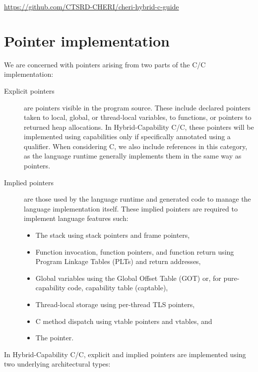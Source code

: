 \documentclass[12pt,twoside,openright,a4paper]{article}
\newcommand{\ccode}[1]{{\small\ttfamily{#1}}}
\newcommand{\uucap}{{\ccode{\_\_capability}}\xspace}
\newcommand*{\cpp}{\texorpdfstring{C\textsmaller[2]{\protect\nolinebreak[4]\hspace{-.05em}\raisebox{.45ex}{\textbf{++}}}}{C++}}
\newcommand*{\COrCpp}{C/\cpp{}}
\newcommand*{\hybridCOrCpp}{Hybrid-Capability \COrCpp{}}
\begin{document}
\smallskip

\url{https://github.com/CTSRD-CHERI/cheri-hybrid-c-guide}

\section{Pointer implementation}

We are concerned with pointers arising from two parts of the \COrCpp{} implementation:

\begin{description}
\item[Explicit pointers] are pointers visible in the program source.
  These include declared pointers taken to local, global, or thread-local
  variables, to functions, or pointers to returned heap allocations.
  In \hybridCOrCpp{}, these pointers will be implemented using capabilities
  only if specifically annotated using a \uucap qualifier.
  When considering \cpp, we also include references in this category, as
  the language runtime generally implements them in the same way as pointers.

\item[Implied pointers] are those used by the language runtime and generated
  code to manage the language implementation itself.
  These implied pointers are required to implement language features such:

  \begin{itemize}
  \item The stack using stack pointers and frame pointers,
  \item Function invocation, function pointers, and function return using
    Program Linkage Tables (PLTs) and return addresses,
  \item Global variables using the Global Offset Table (GOT) or, for
    pure-capability code, capability table (captable),
  \item Thread-local storage using per-thread TLS pointers,
  \item \cpp{} method dispatch using vtable pointers and vtables, and
  \item The \ccode{this} pointer.
  \end{itemize}
\end{description}

\noindent
In \hybridCOrCpp{}, explicit and implied pointers are implemented using two underlying
architectural types:
\end{document}
